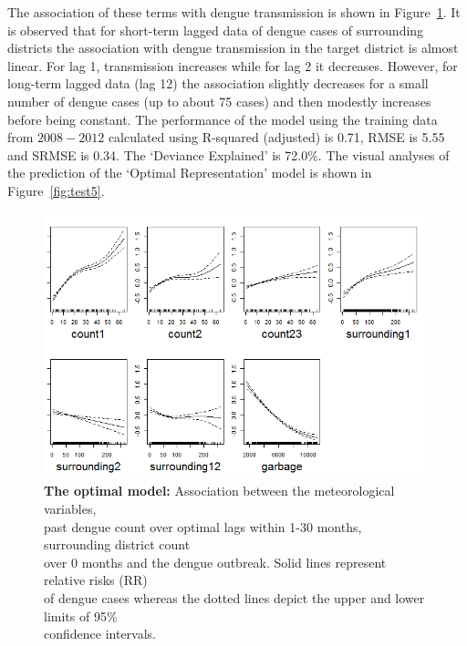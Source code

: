 \documentclass{bmcart}
\begin{document}
The association of these terms with dengue transmission is shown in Figure~\ref{figure-mostOptimalFit}. It is observed that for short-term lagged data of dengue cases of surrounding districts the association with dengue transmission in the target district is almost linear. For lag 1, transmission increases while for lag 2 it decreases. However, for long-term lagged data (lag 12) the association slightly decreases for a small number of dengue cases (up to about 75 cases) and then modestly increases before being constant. The performance of the model using the training data from $2008-2012$ calculated using R-squared (adjusted) is 0.71, RMSE is 5.55 and SRMSE is 0.34. The `Deviance Explained' is 72.0\%. The visual analyses of the prediction of the `Optimal Representation' model is shown in Figure~\ref{fig:test5}. 




\begin{figure}[h!]
	\begin{center}
		\includegraphics[width= 0.97 \textwidth]{Fit-OptimalRepresentation+Garbage}
		\caption{\textbf{The optimal model:} Association between the meteorological variables, \\ past dengue count over optimal lags within 1-30 months, surrounding district count \\  over 0 months and the dengue outbreak. Solid lines represent relative risks (RR) \\ of dengue cases whereas the dotted lines depict the upper and lower limits of 95\% \\ confidence intervals.}
		\label{figure-mostOptimalFit}
	\end{center}
\end{figure}
\end{document}
